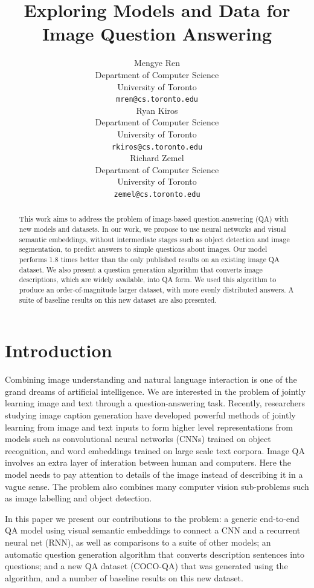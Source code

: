 \documentclass{article} %
\title{Exploring Models and Data for Image Question Answering}
\author{
Mengye Ren\\
Department of Computer Science\\
University of Toronto\\
\texttt{mren@cs.toronto.edu} \\
\And
Ryan Kiros\\
Department of Computer Science\\
University of Toronto\\
\texttt{rkiros@cs.toronto.edu} \\
\And
Richard Zemel\\
Department of Computer Science\\
University of Toronto\\
\texttt{zemel@cs.toronto.edu} \\
}
\renewcommand{\#}[1]{\textbf{#1}}
\begin{document}
\maketitle

\begin{abstract}
This work aims to address the problem of image-based question-answering (QA)
with new models and datasets. In our work, we propose to use neural networks
and visual semantic embeddings, without intermediate stages such as object
detection and image segmentation, to predict answers to simple questions about
images. Our model performs 1.8 times better than the only published results on
an existing image QA dataset. We also present a question
generation algorithm that converts image descriptions, which are widely
available, into QA form. We used this algorithm to produce an
order-of-magnitude larger dataset, with more evenly distributed
answers. A suite of baseline results on this new dataset are also presented.
\end{abstract}

\section{Introduction}
Combining image understanding and natural language interaction is one of the
grand dreams of artificial intelligence. We are interested in the problem of
jointly learning image and text through a question-answering task. Recently,
researchers studying image caption generation 
\cite{vinyals14,kiros14b,karpathy14,mao14,donahue14,chen14,fang14,xu15,lebret15,klein15} 
have developed powerful methods
of jointly learning from image and text inputs to form higher level representations
from models such as convolutional neural networks (CNNs) trained on object
recognition, and word embeddings trained on large scale text corpora. Image QA 
involves an extra layer of interation between human and computers. Here the model 
needs to pay attention to details 
of the image instead of describing it in a vague sense. The problem also 
combines many computer vision sub-problems such as image labelling and object 
detection. 

In this paper we present our contributions to the problem: a generic end-to-end
QA model using visual semantic embeddings to connect a CNN and a recurrent
neural net (RNN), as well as comparisons to a suite of other models; an
automatic 
question generation algorithm that converts
description sentences into questions; and a new QA dataset (COCO-QA) that was
generated using the algorithm, and a number of baseline results on this new dataset. 
\end{document}

